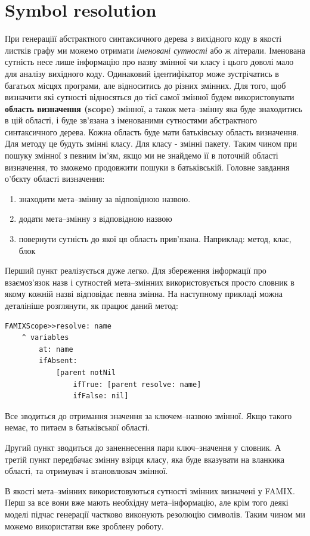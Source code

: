\documentclass[12pt,a4paper]{article}
\begin{document}
\section{Symbol resolution}
При генераціїї абстрактного синтаксичного дерева з вихідного коду в якості листків графу ми можемо отримати \emph{іменовані сутності} або ж літерали. Іменована сутність несе лише інформацію про назву змінної чи класу і цього доволі мало для аналізу вихідного коду. Одинаковий ідентифікатор може зустрічатись в багатьох місцях програми, але відноситись до різних змінних. Для того, щоб визначити які сутності відносяться до тієї самої змінної будем використовувати \textbf{область визначення (scope)} змінної, а також мета--змінну яка буде знаходитись в цій області, і буде зв'язана з іменованими сутностями абстрактного синтаксичного дерева. Кожна область буде мати батьківську область визначення. Для методу це будуть змінні класу. Для класу - змінні пакету. Таким чином при пошуку змінної з певним ім'ям, якщо ми не знайдемо її в поточній області визначення, то зможемо продовжити пошуки в батьківській. Головне завдання о'бєкту області визначення:
\begin{enumerate}
\item знаходити мета--змінну за відповідною назвою.
\item додати мета--змінну з відповідною назвою
\item повернути сутність до якої ця область прив'язана. Наприклад: метод, клас, блок
\end{enumerate}

Перший пункт реалізується дуже легко. Для збереження інформації про взаємоз'язок назв і сутностей мета--змінних використовується просто словник в якому кожній назві відповідає певна змінна. На наступному прикладі можна деталініше розглянути, як працює даний метод:
\begin{lstlisting}[language=Smalltalk]
FAMIXScope>>resolve: name
	^ variables
		at: name
		ifAbsent: 
			[parent notNil 
				ifTrue: [parent resolve: name] 
				ifFalse: nil]
\end{lstlisting}
Все зводиться до отримання значення за ключем--назвою змінної. Якщо такого немає, то питаєм в батьківської області.

Другий пункт зводиться до заненнесення пари ключ--значення у словник. А третій пункт передбачає змінну взірця класу, яка буде вказувати на вланкика області, та отримувач і втановлювач змінної.

В якості мета--змінних використовуються сутності змінних визначені у FAMIX. Перш за все вони вже мають необхідну мета--інформацію, але крім того деякі моделі підчас генерації частково виконують резолюцію символів. Таким чином ми можемо використатви вже зроблену роботу.
\end{document}
